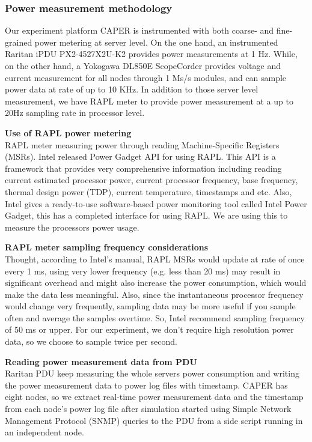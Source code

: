 \subsubsection{Power measurement methodology}
Our experiment platform CAPER is instrumented with both coarse- and fine-grained power metering at server level. On the one hand, an instrumented Raritan iPDU PX2-4527X2U-K2 provides power measurements at 1 Hz. While, on the other hand, a Yokogawa DL850E ScopeCorder provides voltage and current measurement for all nodes through 1 Ms/s modules, and can sample power data at rate of up to 10 KHz. In addition to those server level measurement, we have RAPL meter to provide power measurement at a up to 20Hz sampling rate in processor level. 


\textbf{Use of RAPL power metering}\\
RAPL meter measuring power through reading Machine-Specific Registers (MSRs). Intel released Power Gadget API for using RAPL. This API is a framework that provides very comprehensive information including reading current estimated processor power, current processor frequency, base frequency, thermal design power (TDP), current temperature, timestamps and etc. Also, Intel gives a ready-to-use software-based power monitoring tool called Intel Power Gadget, this has a completed interface for using RAPL. We are using this to measure the processors power usage. 


\textbf{RAPL meter sampling frequency considerations}\\
Thought, according to Intel’s manual,\cite{intel64and} RAPL MSRs would update at rate of once every 1 ms, using very lower frequency (e.g. less than 20 ms) may result in significant overhead and might also increase the power consumption, which would make the data less meaningful.\cite{usingtheintelpowergadgetapionmacosx} Also, since the instantaneous processor frequency would change very frequently, sampling data may be more useful if you sample often and average the samples overtime. So, Intel recommend sampling frequency of 50 ms or upper. For our experiment, we don’t require high resolution power data, so we choose to sample twice per second.


\textbf{Reading power measurement data from PDU}\\
Raritan PDU keep measuring the whole servers power consumption and writing the power measurement data to power log files with timestamp. CAPER has eight nodes, so we extract real-time power measurement data and the timestamp from each node’s power log file after simulation started using Simple Network Management Protocol (SNMP) queries to the PDU from a side script running in an independent node.


